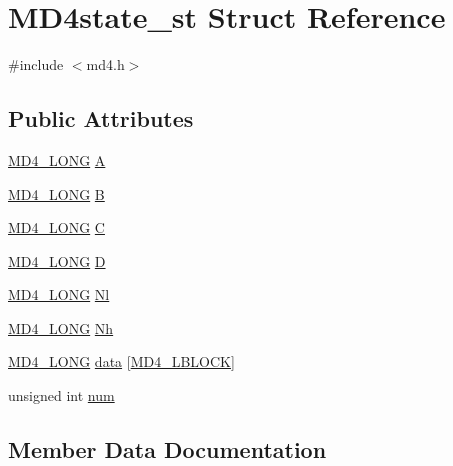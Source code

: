 \hypertarget{struct_m_d4state__st}{}\section{M\+D4state\+\_\+st Struct Reference}
\label{struct_m_d4state__st}


{\ttfamily \#include $<$md4.\+h$>$}

\subsection*{Public Attributes}
\begin{DoxyCompactItemize}
\item 
\hyperlink{md4_8h_ad1088f1ba76d4b0e1ac5b25152319e89}{M\+D4\+\_\+\+L\+O\+NG} \hyperlink{struct_m_d4state__st_a9573434688a6578764e83cf2c3ea5d20}{A}
\item 
\hyperlink{md4_8h_ad1088f1ba76d4b0e1ac5b25152319e89}{M\+D4\+\_\+\+L\+O\+NG} \hyperlink{struct_m_d4state__st_aa04cb7f782726f8ab6d9e78fc4b93f63}{B}
\item 
\hyperlink{md4_8h_ad1088f1ba76d4b0e1ac5b25152319e89}{M\+D4\+\_\+\+L\+O\+NG} \hyperlink{struct_m_d4state__st_a9397abcee77c8bdfdbb2d47fc448e486}{C}
\item 
\hyperlink{md4_8h_ad1088f1ba76d4b0e1ac5b25152319e89}{M\+D4\+\_\+\+L\+O\+NG} \hyperlink{struct_m_d4state__st_ac918583b54dc234e97953a32ac0ae97f}{D}
\item 
\hyperlink{md4_8h_ad1088f1ba76d4b0e1ac5b25152319e89}{M\+D4\+\_\+\+L\+O\+NG} \hyperlink{struct_m_d4state__st_a7f97311bae9341a6566991805a529f38}{Nl}
\item 
\hyperlink{md4_8h_ad1088f1ba76d4b0e1ac5b25152319e89}{M\+D4\+\_\+\+L\+O\+NG} \hyperlink{struct_m_d4state__st_a8a0b1c520fc5b0eaeb310263694a46f8}{Nh}
\item 
\hyperlink{md4_8h_ad1088f1ba76d4b0e1ac5b25152319e89}{M\+D4\+\_\+\+L\+O\+NG} \hyperlink{struct_m_d4state__st_a7d723771095f8b3e5404cc5833603551}{data} \mbox{[}\hyperlink{md4_8h_a355848ebbfb1946058a9de73968a62e9}{M\+D4\+\_\+\+L\+B\+L\+O\+CK}\mbox{]}
\item 
unsigned int \hyperlink{struct_m_d4state__st_ae7e35fdee3a693c34c4322b00e9a9541}{num}
\end{DoxyCompactItemize}


\subsection{Member Data Documentation}
